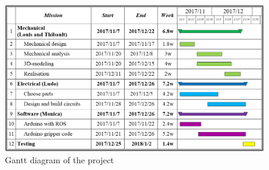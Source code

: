 \documentclass[letterpaper, 10 pt, conference]{ieeeconf}  %
\begin{document}
\begin{figure}[h]
\includegraphics[width=\columnwidth]{gantt}
\centering
\caption{Gantt diagram of the project}
 \label{figure:gantt}
\end{figure}


\addtolength{\textheight}{-12cm}   %



\end{document}
